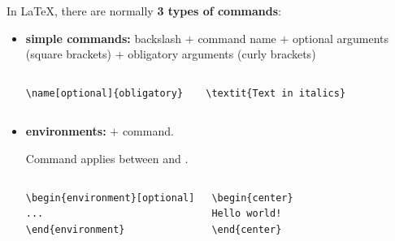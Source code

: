 \begin{frame}[fragile]

In \LaTeX , there are normally \textbf{3 types of commands}:

\begin{itemize}
	\item \textbf{simple commands:} backslash $+$ command name $+$ optional arguments (square brackets) $+$ obligatory arguments (curly brackets)

\vspace{-.5cm}

\begin{columns}
	
\begin{lstlisting}
\name[optional]{obligatory} 
\end{lstlisting}

	
\begin{lstlisting}
\textit{Text in italics} 
\end{lstlisting}
	
\end{columns}
\end{itemize}

\pause 

\begin{itemize}
	\item \textbf{environments:}  $+$  command. 
		
	Command applies between  and .

\vspace{-.5cm}

\begin{columns}
	
\begin{lstlisting}
\begin{environment}[optional]
...
\end{environment}

\end{lstlisting}


\begin{lstlisting}
\begin{center}
Hello world!
\end{center}
\end{lstlisting}


\end{columns}
\end{itemize}
\end{frame}
